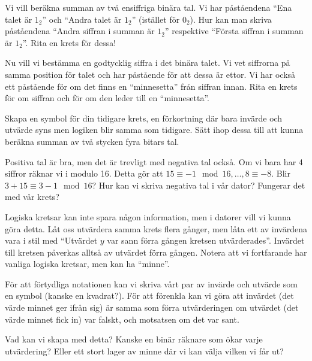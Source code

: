 \begin{problem}
	Vi vill beräkna summan av två ensiffriga binära tal. Vi har påståendena ``Ena talet är \(1_2\)'' och ``Andra talet är \(1_2\)'' (istället för \(0_2\)). Hur kan man skriva påståendena ``Andra siffran i summan är \(1_2\)'' respektive ``Första siffran i summan är \(1_2\)''. Rita en krets för dessa!
\end{problem}

\begin{problem}
	Nu vill vi bestämma en godtycklig siffra i det binära talet. Vi vet siffrorna på samma position för talet och har påstående för att dessa är ettor. Vi har också ett påstående för om det finns en ``minnesetta'' från siffran innan. Rita en krets för om siffran och för om den leder till en ``minnesetta''.
\end{problem}

\begin{problem}
	Skapa en symbol för din tidigare krets, en förkortning där bara invärde och utvärde syns men logiken blir samma som tidigare. Sätt ihop dessa till att kunna beräkna summan av två stycken fyra bitars tal.
\end{problem}

\begin{problem}[Extra]
	Positiva tal är bra, men det är trevligt med negativa tal också. Om vi bara har 4 siffror räknar vi i modulo 16. Detta gör att \(15 \equiv -1 \mod 16, \dots , 8 \equiv -8\). Blir \(3 + 15 \equiv 3 - 1 \mod 16\)? Hur kan vi skriva negativa tal i vår dator? Fungerar det med vår krets?
\end{problem}

\begin{problem}[Extra]
	Logiska kretsar kan inte spara någon information, men i datorer vill vi kunna göra detta. Låt oss utvärdera samma krets flera gånger, men låta ett av invärdena vara i stil med ``Utvärdet \(y\) var sann förra gången kretsen utvärderades''. Invärdet till kretsen påverkas alltså av utvärdet förra gången. Notera att vi fortfarande har vanliga logiska kretsar, men kan ha ``minne''. 

	För att förtydliga notationen kan vi skriva vårt par av invärde och utvärde som en symbol (kanske en kvadrat?). För att förenkla kan vi göra att invärdet (det värde minnet ger ifrån sig) är samma som förra utvärderingen om utvärdet (det värde minnet fick in) var falskt, och motsatsen om det var sant.

	Vad kan vi skapa med detta? Kanske en binär räknare som ökar varje utvärdering? Eller ett stort lager av minne där vi kan välja vilken vi får ut?
\end{problem}


% 
